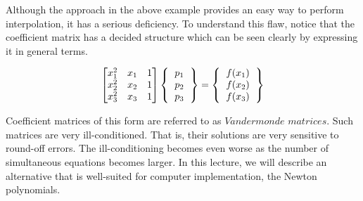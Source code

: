 \documentclass[book.tex]{subfiles}
\begin{document}
Although the approach in the above example provides an easy way to perform interpolation, it has a serious deficiency. To understand this flaw, notice that the coefficient matrix has a decided structure which can be seen clearly by expressing it in general terms. 
\begin{marginfigure}
\[
\begin{bmatrix}
x_1^2 & x_1 & 1 \\ 
x_2^2 & x_2 & 1 \\  
x_3^2 & x_3 & 1 
\end{bmatrix}
\left \{
\begin{tabular}{c}
$p_1$ \\
$p_2$ \\
$p_3$ 
\end{tabular}
\right \}
=
\left \{
\begin{tabular}{c}
$f(x_1)$ \\
$f(x_2)$ \\
$f(x_3)$ 
\end{tabular}
\right \}
\vspace{-6pt}
\]
\end{marginfigure}
Coefficient matrices of this form are referred to as $\textit{Vandermonde matrices}$. Such matrices are very ill-conditioned. That is, their solutions are very sensitive to round-off errors. The ill-conditioning becomes even worse as the number of simultaneous equations becomes larger. In this lecture, we will describe an alternative that is well-suited for
computer implementation, the Newton polynomials.\\
\end{document}
